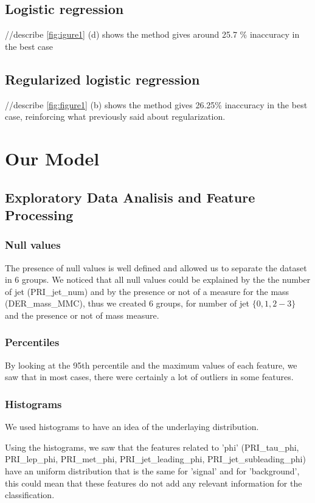 \documentclass[10pt,conference,compsocconf]{IEEEtran}
\begin{document}
\subsection{Logistic regression}
//describe
\ref{fig:igure1} (d) shows the method gives around 25.7 \% inaccuracy in the best case
\subsection{Regularized logistic regression}
//describe
\ref{fig:figure1} (b) shows the method gives 26.25\% inaccuracy in the best case, reinforcing what previously said about regularization.
\section{Our Model}
\subsection{Exploratory Data Analisis and Feature Processing}
\subsubsection{Null values}
The presence of null values is well defined and allowed us to separate the
dataset in 6 groups. We noticed that all null values could be
explained by the the number of jet (PRI\_jet\_num) and by the presence or not of a
measure for the mass (DER\_mass\_MMC), thus we created 6 groups, for number of jet
$\lbrace 0, 1, 2-3 \rbrace$ and the presence or not of mass measure.

\subsubsection{Percentiles}

By looking at the 95th percentile and the maximum values of each feature, we saw
that in most cases, there were certainly a lot of outliers in some features.

\subsubsection{Histograms}

We used histograms to have an idea of the underlaying distribution.

Using the histograms, we saw that the features related to 'phi' (PRI\_tau\_phi,
PRI\_lep\_phi, PRI\_met\_phi, PRI\_jet\_leading\_phi, PRI\_jet\_subleading\_phi)
have an uniform distribution that is the same
for 'signal' and for 'background', this could mean that these features do not add
any relevant information for the classification.
\end{document}
